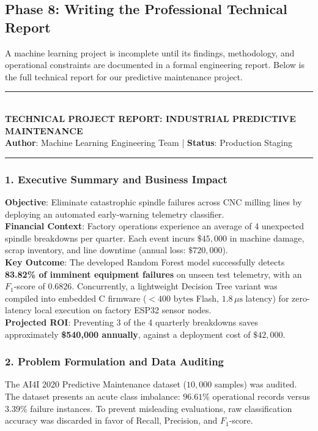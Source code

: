 \subsection{Phase 8: Writing the Professional Technical Report}

A machine learning project is incomplete until its findings, methodology, and operational constraints are documented in a formal engineering report. Below is the full technical report for our predictive maintenance project.

\begin{center}
\rule{0.9\textwidth}{0.8pt} \\[2mm]
\textbf{\large TECHNICAL PROJECT REPORT: INDUSTRIAL PREDICTIVE MAINTENANCE} \\[1mm]
\textbf{Author}: Machine Learning Engineering Team \quad | \quad \textbf{Status}: Production Staging \\
\rule{0.9\textwidth}{0.8pt}
\end{center}

\subsubsection*{1. Executive Summary and Business Impact}
\textbf{Objective}: Eliminate catastrophic spindle failures across CNC milling lines by deploying an automated early-warning telemetry classifier. \\
\textbf{Financial Context}: Factory operations experience an average of 4 unexpected spindle breakdowns per quarter. Each event incurs $\$45{,}000$ in machine damage, scrap inventory, and line downtime (annual loss: $\$720{,}000$). \\
\textbf{Key Outcome}: The developed Random Forest model successfully detects \textbf{83.82\% of imminent equipment failures} on unseen test telemetry, with an $F_1$-score of $0.6826$. Concurrently, a lightweight Decision Tree variant was compiled into embedded C firmware ($< 400\text{ bytes}$ Flash, $1.8\,\mu\text{s}$ latency) for zero-latency local execution on factory ESP32 sensor nodes. \\
\textbf{Projected ROI}: Preventing 3 of the 4 quarterly breakdowns saves approximately \textbf{\$540,000 annually}, against a deployment cost of $\$42{,}000$.

\subsubsection*{2. Problem Formulation and Data Auditing}
The AI4I 2020 Predictive Maintenance dataset ($10{,}000$ samples) was audited. The dataset presents an acute class imbalance: $96.61\%$ operational records versus $3.39\%$ failure instances. To prevent misleading evaluations, raw classification accuracy was discarded in favor of Recall, Precision, and $F_1$-score.

